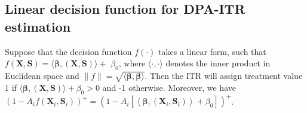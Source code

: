 \documentclass[12pt]{article}
\theoremstyle{plain}
\theoremstyle{definition}
\theoremstyle{remark}
\begin{document}
\subsection{Linear decision function for DPA-ITR estimation}
Suppose that the decision function $f(\cdot)$ takes a linear form, such that $f(\boldsymbol{X},\boldsymbol{S})=\langle\boldsymbol{\beta}, (\boldsymbol{X},\boldsymbol{S})\rangle+$ ${\beta}_0$, where $\langle\cdot, \cdot\rangle$ denotes the inner product in Euclidean space and $\|f\|=\sqrt{\langle\boldsymbol{\beta}, \boldsymbol{\beta}\rangle}$. Then the ITR will assign treatment value 1 if $\langle\boldsymbol{\beta}, (\boldsymbol{X},\boldsymbol{S})\rangle+{\beta}_0>0$ and -1 otherwise. Moreover, we have $\left(1-A_i f\left(\boldsymbol{X}_i,\boldsymbol{S}_i\right)\right)^{+}=\left(1- A_i[\left\langle\boldsymbol{\beta},(\boldsymbol{X}_i, \boldsymbol{S}_i) \right\rangle+{\beta}_0]\right)^{+}$.
\end{document}
